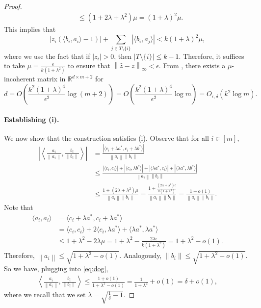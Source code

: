 \documentclass[10pt,a4paper]{amsart}
\newcommand{\RR}{\mathbb{R}}
\newcommand{\norm}[1]{\left\|#1\right\|}
\begin{document}
\begin{proof}
\begin{align}
        &\le (1+2\lambda+\lambda^2)\mu = (1 + \lambda)^2\mu.
    \end{align}
    This implies that 
    \begin{equation}
        |z_i(\langle b_i, a_i \rangle - 1)| + \sum_{j\in T\setminus \{i\}} |\langle b_i, a_j\rangle| < k (1 + \lambda)^2\mu,
    \end{equation}
    where we use the fact that if $|z_i| > 0$, then $|T\setminus \{i\}|\le k-1.$ Therefore, it suffices to take $\mu = \frac{\epsilon}{k(1+\lambda^2)}$ to ensure that $\norm{\hat{z}-z}_\infty < \epsilon.$ From , there exists a $\mu$-incoherent matrix in $\RR^{d\times m+2}$ for
    \begin{equation}
        d = O\left(\frac{k^2(1+\lambda)^4}{\epsilon^2}\log (m+2)\right) = O\left(\frac{k^2(1+\lambda)^4}{\epsilon^2}\log m\right) = O_{\epsilon,\delta}(k^2\log m).
    \end{equation}

    \paragraph{Establishing (i).} We now show that the construction satisfies (i). Observe that for all $i\in [m],$
    \begin{align}
        \left|\left\langle \frac{a_i}{\norm{a_i}}, \frac{b_i}{\norm{b_i}} \right\rangle\right|
        &= \frac{|\langle c_i + \lambda a^*, c_i + \lambda b^*\rangle|}{\norm{a_i}\norm{b_i}}\\
        &\le \frac{|\langle c_i, c_i\rangle| + |\langle c_i, \lambda b^*\rangle| + |\langle \lambda a^*, c_i \rangle| + |\langle \lambda a^*, \lambda b^* \rangle|}{\norm{a_i}\norm{b_i}}\\
        &\le \frac{1 + (2\lambda  + \lambda^2)\mu}{\norm{a_i}\norm{b_i}} = \frac{1 + \frac{(2\lambda  + \lambda^2)\epsilon}{k(1+\lambda^2)}}{\norm{a_i}\norm{b_i}} = \frac{1 + o(1)}{\norm{a_i}\norm{b_i}}.\label{eq:dog}
    \end{align}
    Note that
    \begin{align}
        \langle a_i, a_i\rangle &= \langle c_i + \lambda a^*, c_i + \lambda a^* \rangle\\ &= \langle c_i, c_i\rangle + 2\langle c_i, \lambda a^*\rangle + \langle \lambda a^*, \lambda a^*\rangle\\
        &\le 1 + \lambda^2 - 2\lambda\mu =  1 + \lambda^2 - \frac{2\lambda\epsilon}{k(1+\lambda^2)} = 1 + \lambda^2 - o(1).
    \end{align}
    Therefore, $\norm{a_i} \le \sqrt{1 + \lambda^2 - o(1)}$. Analogously, $\norm{b_i} \le \sqrt{1 + \lambda^2 - o(1)}.$
    So we have, plugging into \eqref{eq:dog},
    \begin{align}
         \left\langle \frac{a_i}{\norm{a_i}}, \frac{b_i}{\norm{b_i}} \right\rangle
         \le \frac{1 + o(1)}{1 + \lambda^2 - o(1)} = \frac{1}{1 + \lambda^2} + o(1) = \delta + o(1),
    \end{align}
    where we recall that we set $\lambda = \sqrt{\frac{1}{\delta} - 1}.$


\end{proof}
\end{document}
